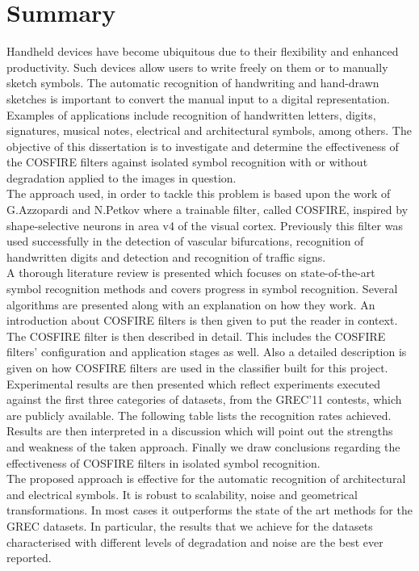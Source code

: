 \chapter{Summary}

Handheld devices have become ubiquitous due to their flexibility and enhanced productivity. Such devices allow users to write freely on them or to manually sketch symbols. The automatic recognition of handwriting and hand-drawn sketches is important to convert the manual input to a digital representation. Examples of applications include recognition of handwritten letters, digits, signatures, musical notes, electrical and architectural symbols, among others. The objective of this dissertation is to investigate and determine the effectiveness of the COSFIRE filters against isolated symbol recognition with or without degradation applied to the images in question.\\

The approach used, in order to tackle this problem is based upon the work of G.Azzopardi and N.Petkov where a trainable filter, called COSFIRE, inspired by shape-selective neurons in area v4 of the visual cortex. Previously this filter was used successfully in the detection of vascular bifurcations, recognition of handwritten digits and detection and recognition of traffic signs. \\

A thorough literature review is presented which focuses on state-of-the-art symbol recognition methods and covers progress in symbol recognition. Several algorithms are presented along with an explanation on how they work. An introduction about COSFIRE filters is then given to put the reader in context. The COSFIRE filter is then described in detail. This includes the COSFIRE filters' configuration and application stages as well. Also a detailed description is given on how COSFIRE filters are used in the classifier built for this project.\\

Experimental results are then presented which reflect experiments executed against the first three categories of datasets, from the GREC'11 contests, which are publicly available. The following table lists the recognition rates achieved. Results are then interpreted in a discussion which will point out the strengths and weakness of the taken approach. Finally we draw conclusions regarding the effectiveness of COSFIRE filters in isolated symbol recognition. \\

The proposed approach is effective for the automatic recognition of architectural and electrical symbols. It is robust to scalability, noise and geometrical transformations. In most cases it outperforms the state of the art methods for the GREC datasets. In particular, the results that we achieve for the datasets characterised with different levels of degradation and noise are the best ever reported.